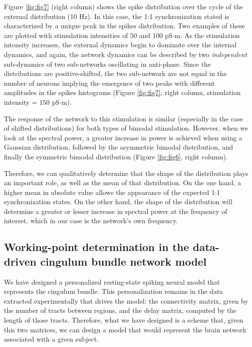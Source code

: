 \documentclass[../main.tex]{subfiles}
\begin{document}
Figure \ref{fig:fig7} (right column) shows the spike distribution over the cycle of the external distribution (10 Hz).
In this case, the 1:1 synchronization stated is characterized by a unique peak in the spikes distribution.
Two examples of these are plotted with stimulation intensities of $50$ and $100$ pS$\cdot$m.
As the stimulation intensity increases, the external dynamics begin to dominate over the internal dynamics, and again, the network dynamics can be described by two \textit{independent} sub-dynamics of two sub-networks oscillating in anti-phase.
Since the distributions are positive-shifted, the two sub-network are not equal in the number of neurons implying the emergence of two peaks with different amplitudes in the spikes histograms (Figure \ref{fig:fig7}, right column, stimulation intensity = $150$ pS$\cdot$m).

The response of the network to this stimulation is similar (especially in the case of shifted distributions) for both types of bimodal stimulation.
However, when we look at the spectral power, a greater increase in power is achieved when using a Gaussian distribution, followed by the asymmetric bimodal distribution, and finally the symmetric bimodal distribution (Figure \ref{fig:fig6}, right column).

Therefore, we can qualitatively determine that the shape of the distribution plays an important role, as well as the mean of that distribution.
On the one hand, a higher mean in absolute value allows the appearance of the expected 1:1 synchronization states.
On the other hand, the shape of the distribution will determine a greater or lesser increase in spectral power at the frequency of interest, which in our case is the network's own frequency.

\subsection{Working-point determination in the data-driven cingulum bundle network model}
We have designed a personalized resting-state spiking neural model that represents the cingulum bundle.
This personalization remains in the data extracted experimentally that drives the model: the connectivity matrix, given by the number of tracts between regions, and the delay matrix, computed by the length of those tracts.
Therefore, what we have designed is a scheme that,  given this two matrices, we can design a model that would represent the brain network associated with a given subject.
\end{document}
